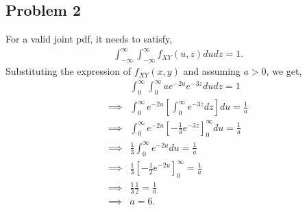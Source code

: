 \subsection*{Problem 2}
For a valid joint pdf, it needs to satisfy,
\begin{align*}
	\int_{-\infty}^{\infty}\int_{-\infty}^{\infty} f_{XY}(u,z) du dz = 1.
\end{align*}
Substituting the expression of $f_{XY}(x,y)$ and assuming $a >0$, we get,
\begin{align*}
	& \int_{0}^{\infty}\int_{0}^{\infty} a e^{-2u}e^{-3z} du dz = 1\\
	\implies & \int_{0}^{\infty} e^{-2u}\left[\int_{0}^{\infty}e^{-3z}dz\right] du = \frac{1}{a}\\
	\implies & \int_{0}^{\infty} e^{-2u}\left[-\frac{1}{3}e^{-3z}\right]_0^{\infty}du = \frac{1}{a}\\
	\implies & \frac{1}{3}\int_{0}^{\infty} e^{-2u}du = \frac{1}{a}\\
	\implies & \frac{1}{3}\left[-\frac{1}{2}e^{-2u}\right]_0^{\infty} = \frac{1}{a}\\
	\implies & \frac{1}{3}\frac{1}{2} = \frac{1}{a}\\
	\implies & a = 6.
\end{align*}
